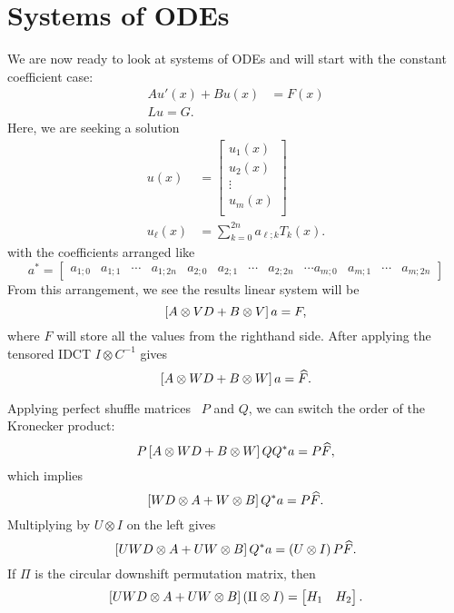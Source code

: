 \section{Systems of ODEs}
\label{sec:odes_systems}

We are now ready to look at systems of ODEs and will
start with the constant coefficient case:
%
\begin{align}
    Au'(x) + Bu(x) &= F(x) \nonumber\\
    Lu = G.
\end{align}
%
Here, we are seeking a solution
%
\begin{align}
    u(x) &= \begin{bmatrix}
            u_{1}(x) \\
            u_{2}(x) \\
            \vdots \\
            u_{m}(x) \\ \end{bmatrix} \nonumber\\
    u_{\ell}(x) &= \sum_{k=0}^{2n} a_{\ell;k}T_{k}(x).
\end{align}
%
with the coefficients arranged like
%
\begin{equation}
    a^{*} = \begin{bmatrix}
        a_{1;0} & a_{1;1} & \cdots & a_{1;2n} &
        a_{2;0} & a_{2;1} & \cdots & a_{2;2n} & \cdots
        a_{m;0} & a_{m;1} & \cdots & a_{m;2n} \end{bmatrix}
\end{equation}
%
From this arrangement, we see the results linear system will be
%
\begin{equation}
    \left[ A\otimes VD + B\otimes V \right]a = F,
\end{equation}
%
where $F$ will store all the values from the righthand side.
After applying the tensored IDCT $I\otimes C^{-1}$
gives
%
\begin{equation}
    \left[ A\otimes WD + B\otimes W \right]a = \widehat{F}.
\end{equation}

\noindent
Applying perfect shuffle matrices~\cite{vanLoan2000ubiquitous} $P$
and $Q$, we can switch the order of the Kronecker product:
%
\begin{equation}
    P\left[ A\otimes WD + B\otimes W \right]QQ^{*}a = P\widehat{F},
\end{equation}
%
which implies
%
\begin{equation}
    \left[ WD\otimes A + W\otimes B \right]Q^{*}a = P\widehat{F}.
\end{equation}
%
Multiplying by $U\otimes I$ on the left gives
%
\begin{equation}
    \left[ UWD\otimes A + UW\otimes B \right]Q^{*}a
        = \left( U\otimes I \right)P\widehat{F}.
\end{equation}
%
If $\Pi$ is the circular downshift permutation matrix, then
%
\begin{equation}
    \left[ UWD\otimes A + UW\otimes B \right]\left( \Pi\otimes I \right)
    = \begin{bmatrix} H_{1} & H_{2} \end{bmatrix}.
\end{equation}

